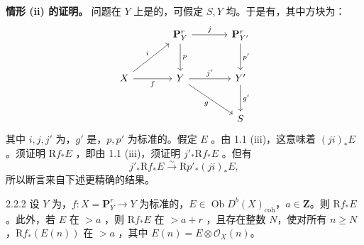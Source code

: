 \textbf{情形 (ii) 的证明。} 问题在 $Y$ 上是的，可假定 $S,Y$ 均。于是有，其中方块为：
\[
\begin{tikzcd}[column sep=large,row sep=large]&\mathbf P_Y^r\arrow[r,"j"]\arrow[d,"p"]&\mathbf P_{Y'}^r\arrow[d,"p'"]\\X\arrow[ur,"i"]\arrow[r,"f"']&Y\arrow[r,"j'"]\arrow[dr,"g"']&Y'\arrow[d,"g'"]\\&&S\end{tikzcd}
\]
其中 $i,j,j'$ 为，$g'$ 是，$p,p'$ 为标准的。假定 $E$ 。由 1.1 (iii)，这意味着 $(ji)_*E$ 。须证明 $\mathrm Rf_*E$ ，即由 1.1 (iii)，须证明 $j'_*\mathrm Rf_*E$ 。但有
\[j'_*\mathrm Rf_*E\xrightarrow{\sim}\mathrm Rp'_*(ji)_*E,\]
所以断言来自下述更精确的结果。
\begin{SGAresult}{}{2.2.2}
设 $Y$ 为，$f:X=\mathbf P_Y^r\to Y$ 为标准的，$E\in\operatorname{Ob}D^b(X)_{\mathrm{coh}}$，$a\in\mathbf Z$。则 $\mathrm Rf_*E$ 。此外，若 $E$ 在 $>a$ ，则 $\mathrm Rf_*E$ 在 $>a+r$ ，且存在整数 $N$，使对所有 $n\ge N$，$\mathrm Rf_*(E(n))$ 在 $>a$ ，其中 $E(n)=E\otimes\mathcal O_X(n)$。
\end{SGAresult}
